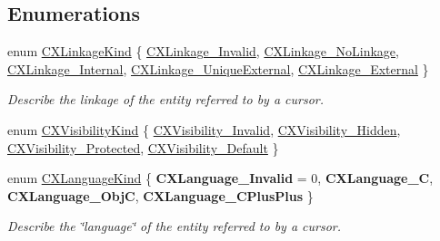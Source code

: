 \subsection*{Enumerations}
\begin{DoxyCompactItemize}
\item 
enum \mbox{\hyperlink{group__CINDEX__CURSOR__MANIP_gace57c68a7a11b0967b184a7ef9fbeb9e}{C\+X\+Linkage\+Kind}} \{ \newline
\mbox{\hyperlink{group__CINDEX__CURSOR__MANIP_ggace57c68a7a11b0967b184a7ef9fbeb9ea1c74a361e26875b381058ab768bc3f37}{C\+X\+Linkage\+\_\+\+Invalid}}, 
\mbox{\hyperlink{group__CINDEX__CURSOR__MANIP_ggace57c68a7a11b0967b184a7ef9fbeb9ea101d38b657f24fca614f7b2586eab0c9}{C\+X\+Linkage\+\_\+\+No\+Linkage}}, 
\mbox{\hyperlink{group__CINDEX__CURSOR__MANIP_ggace57c68a7a11b0967b184a7ef9fbeb9ea38be5867a179378b8262355e2f0b9685}{C\+X\+Linkage\+\_\+\+Internal}}, 
\mbox{\hyperlink{group__CINDEX__CURSOR__MANIP_ggace57c68a7a11b0967b184a7ef9fbeb9ea6f53727f7dc5b57c4ae19f73bad12ef9}{C\+X\+Linkage\+\_\+\+Unique\+External}}, 
\newline
\mbox{\hyperlink{group__CINDEX__CURSOR__MANIP_ggace57c68a7a11b0967b184a7ef9fbeb9ea391eb2ceea056e376acbb9031a4f1722}{C\+X\+Linkage\+\_\+\+External}}
 \}
\begin{DoxyCompactList}\small\item\em Describe the linkage of the entity referred to by a cursor. \end{DoxyCompactList}\item 
enum \mbox{\hyperlink{group__CINDEX__CURSOR__MANIP_gaf92fafb489ab66529aceab51818994cb}{C\+X\+Visibility\+Kind}} \{ \mbox{\hyperlink{group__CINDEX__CURSOR__MANIP_ggaf92fafb489ab66529aceab51818994cbad1ed3fb95497edcf52350079fca2d40e}{C\+X\+Visibility\+\_\+\+Invalid}}, 
\mbox{\hyperlink{group__CINDEX__CURSOR__MANIP_ggaf92fafb489ab66529aceab51818994cba3f73acbdefbcec3e281e16141e8fb105}{C\+X\+Visibility\+\_\+\+Hidden}}, 
\mbox{\hyperlink{group__CINDEX__CURSOR__MANIP_ggaf92fafb489ab66529aceab51818994cba16a29f348585b873fdf5d84f0875bb95}{C\+X\+Visibility\+\_\+\+Protected}}, 
\mbox{\hyperlink{group__CINDEX__CURSOR__MANIP_ggaf92fafb489ab66529aceab51818994cba9ddb2c356afa2f2ac72ef0e2cf71575b}{C\+X\+Visibility\+\_\+\+Default}}
 \}
\item 
\mbox{\label{group__CINDEX__CURSOR__MANIP_ga3abfddcec8a46e7156f37de661af3c14}} 
enum \mbox{\hyperlink{group__CINDEX__CURSOR__MANIP_ga3abfddcec8a46e7156f37de661af3c14}{C\+X\+Language\+Kind}} \{ {\bfseries C\+X\+Language\+\_\+\+Invalid} = 0, 
{\bfseries C\+X\+Language\+\_\+C}, 
{\bfseries C\+X\+Language\+\_\+\+ObjC}, 
{\bfseries C\+X\+Language\+\_\+\+C\+Plus\+Plus}
 \}
\begin{DoxyCompactList}\small\item\em Describe the \char`\"{}language\char`\"{} of the entity referred to by a cursor. \end{DoxyCompactList}\end{DoxyCompactItemize}
